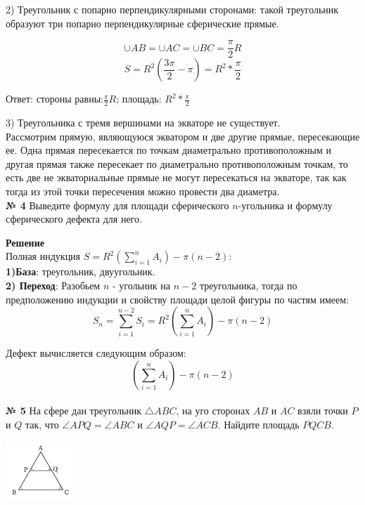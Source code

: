     2) Треугольник с попарно перпендикулярными сторонами:
    такой треугольник образуют три попарно перпендикулярные сферические прямые.

    \[
        \cup AB = \cup AC = \cup BC = \frac{\pi}{2}R
    \]
    \[
        S = R^2\left(\frac{3\pi}{2} - \pi\right) = R^2 * \frac{\pi}{2}
    \]

    Ответ: стороны равны:$\frac{\pi}{2}R$; площадь: $R^2 * \frac{\pi}{2}$

    3) Треугольника с тремя вершинами на экваторе не существует.\\
    Рассмотрим прямую, являющуюся экватором и две другие прямые, пересекающие ее.
    Одна прямая пересекается по точкам диаметрально противоположным и другая прямая также
    пересекает по диаметрально противоположным точкам, то есть две не экваториальные прямые
    не могут пересекаться на экваторе, так как тогда из этой точки пересечения можно провести два диаметра.\\


    \textbf{№ 4}
    Выведите формулу для площади сферического $n$-угольника и формулу сферического дефекта для него.

    \textbf{Решение}\\

    Полная индукция $S = R^2\left(\displaystyle\sum_{i=1}^n A_i\right) - \pi(n - 2)$:\\

    \textbf{1)База}: треугольник, двуугольник.\\

    \textbf{2) Переход}:
    Разобьем $n$ - угольник на $n - 2$ треугольника,
    тогда по предположению индукции и свойству площади целой фигуры по частям имеем:
    \[
        S_n = \displaystyle\sum_{i=1}^{n-2} S_i = R^2\left(\displaystyle\sum_{i=1}^n A_i\right) - \pi(n - 2)
    \]

    Дефект вычисляется следующим образом:
    \[
        \left(\displaystyle\sum_{i=1}^n A_i\right) - \pi(n - 2)
    \]\\


    \textbf{№ 5}
    На сфере дан треугольник $\triangle ABC$, на уго сторонах $AB$ и $AC$ взяли
    точки $P$ и $Q$ так, что $\angle APQ = \angle ABC$ и $\angle AQP = \angle ACB$.
    Найдите площадь $PQCB$.
    \begin{center}
        \includegraphics[width=0.2\textwidth]{images/Frame 72@2x}\\
    \end{center}

